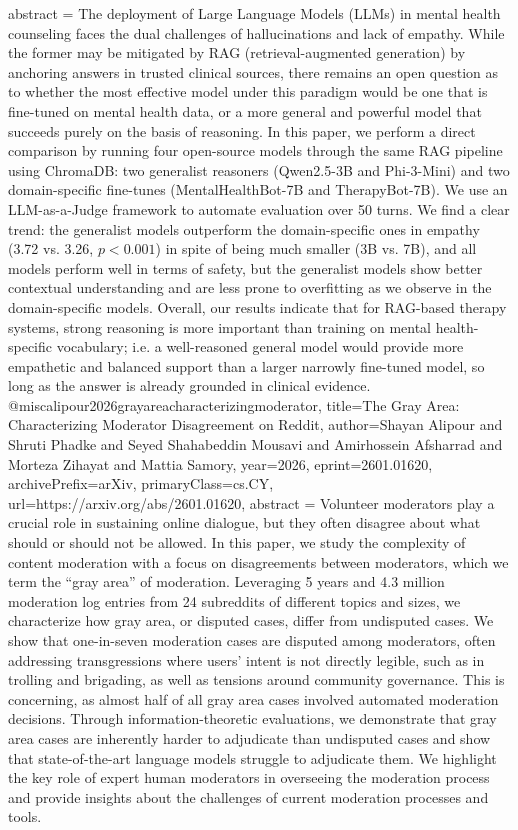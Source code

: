 {      abstract = {The deployment of Large Language Models (LLMs) in mental health counseling faces the dual challenges of hallucinations and lack of empathy. While the former may be mitigated by RAG (retrieval-augmented generation) by anchoring answers in trusted clinical sources, there remains an open question as to whether the most effective model under this paradigm would be one that is fine-tuned on mental health data, or a more general and powerful model that succeeds purely on the basis of reasoning. In this paper, we perform a direct comparison by running four open-source models through the same RAG pipeline using ChromaDB: two generalist reasoners (Qwen2.5-3B and Phi-3-Mini) and two domain-specific fine-tunes (MentalHealthBot-7B and TherapyBot-7B). We use an LLM-as-a-Judge framework to automate evaluation over 50 turns. We find a clear trend: the generalist models outperform the domain-specific ones in empathy (3.72 vs. 3.26, $p < 0.001$) in spite of being much smaller (3B vs. 7B), and all models perform well in terms of safety, but the generalist models show better contextual understanding and are less prone to overfitting as we observe in the domain-specific models. Overall, our results indicate that for RAG-based therapy systems, strong reasoning is more important than training on mental health-specific vocabulary; i.e. a well-reasoned general model would provide more empathetic and balanced support than a larger narrowly fine-tuned model, so long as the answer is already grounded in clinical evidence.}
}@misc{alipour2026grayareacharacterizingmoderator,
      title={The Gray Area: Characterizing Moderator Disagreement on Reddit}, 
      author={Shayan Alipour and Shruti Phadke and Seyed Shahabeddin Mousavi and Amirhossein Afsharrad and Morteza Zihayat and Mattia Samory},
      year={2026},
      eprint={2601.01620},
      archivePrefix={arXiv},
      primaryClass={cs.CY},
      url={https://arxiv.org/abs/2601.01620},
      abstract = {Volunteer moderators play a crucial role in sustaining online dialogue, but they often disagree about what should or should not be allowed. In this paper, we study the complexity of content moderation with a focus on disagreements between moderators, which we term the ``gray area'' of moderation. Leveraging 5 years and 4.3 million moderation log entries from 24 subreddits of different topics and sizes, we characterize how gray area, or disputed cases, differ from undisputed cases. We show that one-in-seven moderation cases are disputed among moderators, often addressing transgressions where users' intent is not directly legible, such as in trolling and brigading, as well as tensions around community governance. This is concerning, as almost half of all gray area cases involved automated moderation decisions. Through information-theoretic evaluations, we demonstrate that gray area cases are inherently harder to adjudicate than undisputed cases and show that state-of-the-art language models struggle to adjudicate them. We highlight the key role of expert human moderators in overseeing the moderation process and provide insights about the challenges of current moderation processes and tools.}
}

